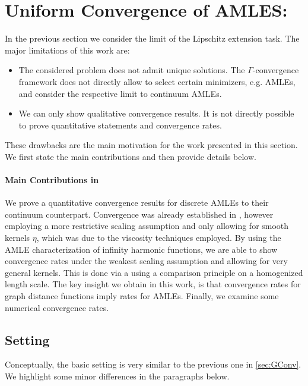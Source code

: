 \section{Uniform Convergence of AMLES: \cite{bungert2021uniform}}\label{sec:UnifConv}
%
%
In the previous section we consider the limit of the Lipschitz extension task. The major limitations of this work are:
%
\begin{itemize}
\item The considered problem does not admit unique solutions. The $\Gamma$-convergence framework does not directly allow to select certain minimizers, e.g. AMLEs, and consider the respective limit to continuum AMLEs.
%
\item We can only show qualitative convergence results. It is not directly possible to prove quantitative statements and convergence rates.
\end{itemize}
%
These drawbacks are the main motivation for the work presented in this section. We first state the main contributions and then provide details below.
%
\paragraph{Main Contributions in \cite{bungert2021uniform}} We prove a quantitative convergence results for discrete AMLEs to their continuum counterpart. Convergence was already established in \cite{calder2019consistency}, however employing a more restrictive scaling assumption and only allowing for smooth kernels $\eta$, which was due to the viscosity techniques employed. By using the AMLE characterization of infinity harmonic functions, we are able to show convergence rates under the weakest scaling assumption and allowing for very general kernels. This is done via a using a comparison principle on a homogenized length scale. The key insight we obtain in this work, is that convergence rates for graph distance functions imply rates for AMLEs. Finally, we examine some numerical convergence rates.
%
%
%
\subsection{Setting}
%
Conceptually, the basic setting is very similar to the previous one in \cref{sec:GConv}. We highlight some minor differences in the paragraphs below.
%
%
